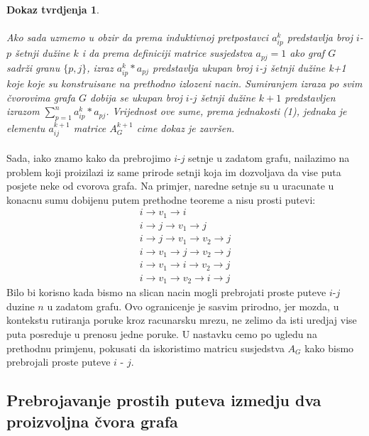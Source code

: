 \documentclass[11pt]{article}
\newtheorem*{custom_proof}{Dokaz tvrdjenja}
\begin{document}
\begin{custom_proof}
			\paragraph{}
			Ako sada uzmemo u obzir da prema induktivnoj pretpostavci $a_{ip}^k$ predstavlja broj $i$-$p$ šetnji dužine $k$ i da prema definiciji matrice susjedstva  $a_{pj}=1$ ako graf $G$ sadrži granu $\{p,j\}$, 
			izraz $a_{ip}^k * a_{pj}$ predstavlja ukupan broj $i$-$j$ šetnji dužine k+1 koje koje su konstruisane na prethodno izlozeni nacin. 
			Sumiranjem izraza po svim čvorovima grafa $G$ dobija se ukupan broj $i$-$j$ šetnji dužine $k+1$ predstavljen izrazom $\sum_{p=1}^{n} a_{ip}^k * a_{pj}$. 
			Vrijednost ove sume, prema jednakosti (1), jednaka je elementu $a_{ij}^{k+1}$ matrice $A_G^{k+1}$ cime dokaz je završen.
		\end{custom_proof}
	
		\paragraph{}
		Sada, iako znamo kako da prebrojimo $i$-$j$ setnje u zadatom grafu, nailazimo na problem koji proizilazi iz same prirode setnji koja im dozvoljava da vise puta posjete neke od cvorova grafa.
		Na primjer, naredne setnje su u uracunate u konacnu sumu dobijenu putem prethodne teoreme a nisu prosti putevi:
		\[
			\begin{split}
			i \rightarrow v_1 \rightarrow i \\
			i \rightarrow  j \rightarrow v_1 \rightarrow j \\
			i \rightarrow j \rightarrow v_1 \rightarrow v_2 \rightarrow j \\
			i \rightarrow v_1 \rightarrow j \rightarrow v_2 \rightarrow j \\
			i \rightarrow v_1 \rightarrow i \rightarrow v_2 \rightarrow j \\
			i \rightarrow v_1 \rightarrow v_2 \rightarrow i \rightarrow j 
			\end{split}
		\]
		 Bilo bi korisno kada bismo na slican nacin mogli prebrojati proste puteve $i$-$j$ duzine $n$ u zadatom grafu. Ovo ogranicenje je sasvim prirodno, jer mozda, u kontekstu rutiranja poruke kroz racunarsku mrezu,
		ne zelimo da isti uredjaj vise puta posreduje u prenosu jedne poruke.  U nastavku cemo po ugledu na prethodnu primjenu, pokusati da iskoristimo matricu susjedstva $A_G$ kako bismo prebrojali proste puteve $i$ - $j$.
		
		\subsection{Prebrojavanje prostih puteva izmedju dva proizvoljna čvora grafa}
	
\end{document}

